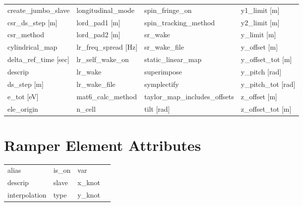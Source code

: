 \begin{tabular}{llll}
create_jumbo_slave               & longitudinal_mode                & spin_fringe_on                   & y1_limit [m]                     \\
csr_ds_step [m]                  & lord_pad1 [m]                    & spin_tracking_method             & y2_limit [m]                     \\
csr_method                       & lord_pad2 [m]                    & sr_wake                          & y_limit [m]                      \\
cylindrical_map                  & lr_freq_spread [Hz]              & sr_wake_file                     & y_offset [m]                     \\
delta_ref_time [sec]             & lr_self_wake_on                  & static_linear_map                & y_offset_tot [m]                 \\
descrip                          & lr_wake                          & superimpose                      & y_pitch [rad]                    \\
ds_step [m]                      & lr_wake_file                     & symplectify                      & y_pitch_tot [rad]                \\
e_tot [eV]                       & mat6_calc_method                 & taylor_map_includes_offsets      & z_offset [m]                     \\
ele_origin                       & n_cell                           & tilt [rad]                       & z_offset_tot [m]                 \\
 \bottomrule
 \end{tabular}
 \vfill
 
 \section{Ramper Element Attributes}
 \label{s:list.ramper}
 
 \begin{tabular}{llll} \toprule
alias                            & is_on                            & var                              &                                  \\
descrip                          & slave                            & x_knot                           &                                  \\
interpolation                    & type                             & y_knot                           &                                  \\
 \bottomrule
 \end{tabular}
 \vfill
 
